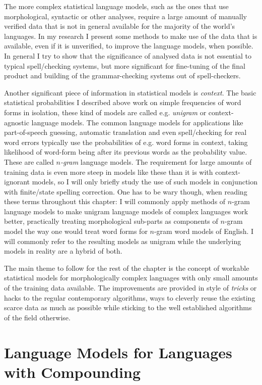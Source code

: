 \documentclass[officiallayout]{unihelcompling}
\begin{document}
The more complex statistical language models, such as the ones that use
morphological, syntactic or other analyses, require a large amount of manually
verified data that is not in general available for the majority of the world's
languages. In my research I present some methods to make use of the data that
is available, even if it is unverified, to improve the language models, when
possible. In general I try to show that the significance of analysed data is
not essential to typical spell\-/checking systems, but more significant for
fine-tuning of the final product and building of the grammar-checking systems
out of spell-checkers.

Another significant piece of information in statistical models is
\emph{context}. The basic statistical probabilities I described above work on
simple frequencies of word forms in isolation, these kind of models are called
e.g. \emph{unigram} or context-agnostic language models. The common language
models for applications like part-of-speech guessing, automatic translation and
even spell\-/checking for real word errors typically use the probabilities of
e.g.  word forms in context, taking likelihood of word-form being after its
previous words as the probability value. These are called \emph{\(n\)-gram}
language models.  The requirement for large amounts of training data is even
more steep in models like these than it is with context-ignorant models, so I
will only briefly study the use of such models in conjunction with finite\-/state
spelling correction. One has to be wary though, when reading these terms
throughout this chapter: I will commonly apply methods of \(n\)-gram language
models to make unigram language models of complex languages work better,
practically treating morphological sub-parts as components of \(n\)-gram model the
way one would treat word forms for \(n\)-gram word models of English. I will
commonly refer to the resulting models as unigram while the underlying models
in reality are a hybrid of both.

The main theme to follow for the rest of the chapter is the concept of workable
statistical models for morphologically complex languages with only small amounts of
the training data available. The improvements are provided in style of
\emph{tricks} or hacks to the regular contemporary algorithms, ways to cleverly
reuse the existing scarce data as much as possible while sticking to the well
established algorithms of the field otherwise.

\section{Language Models for Languages with Compounding}
\label{sec:compounding}
\end{document}
